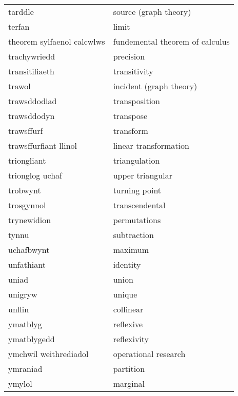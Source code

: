 \begin{supertabular}{p{0.22\textwidth}p{0.22\textwidth}}
                         tarddle &             source (graph theory) \\
                          terfan &                             limit \\
      theorem sylfaenol calcwlws &   fundemental theorem of calculus \\
                    trachywriedd &                         precision \\
                  transitifiaeth &                      transitivity \\
                          trawol &           incident (graph theory) \\
                    trawsddodiad &                     transposition \\
                     trawsddodyn &                         transpose \\
                      trawsffurf &                         transform \\
           trawsffurfiant llinol &             linear transformation \\
                     triongliant &                     triangulation \\
                 trionglog uchaf &                  upper triangular \\
                        trobwynt &                     turning point \\
                      trosgynnol &                    transcendental \\
                     trynewidion &                      permutations \\
                           tynnu &                       subtraction \\
                      uchafbwynt &                           maximum \\
                      unfathiant &                          identity \\
                           uniad &                             union \\
                         unigryw &                            unique \\
                          unllin &                         collinear \\
                        ymatblyg &                         reflexive \\
                     ymatblygedd &                       reflexivity \\
           ymchwil weithrediadol &              operational research \\
                        ymraniad &                         partition \\
                          ymylol &                          marginal \\
\end{supertabular}
